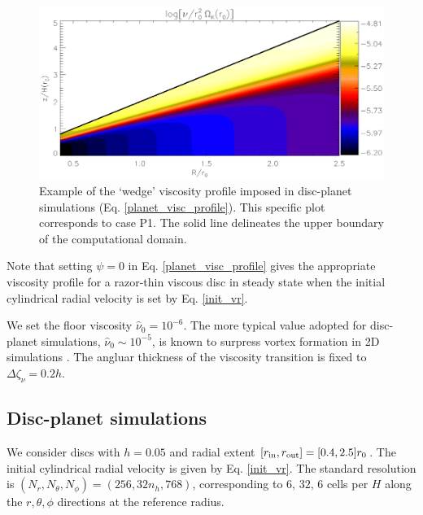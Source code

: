 \begin{figure}
  \centering
  \includegraphics[width=\linewidth]{figures/pdisk_visc2d_planet}
  \caption{Example of the `wedge' viscosity profile
    imposed in disc-planet simulations (Eq. \ref{planet_visc_profile}). This specific plot
    corresponds to case P1. The solid line
    delineates the upper boundary of the computational domain.
    \label{planet_visc2d}}
\end{figure}

Note that setting $\psi = 0$ in Eq. \ref{planet_visc_profile} gives
the appropriate viscosity profile for a razor-thin viscous disc in
steady state when the initial cylindrical radial velocity 
is set by Eq. \ref{init_vr}. 


We set the floor viscosity $\hat{\nu}_0=10^{-6}$. The more typical
value adopted for disc-planet simulations, $\hat{\nu}_0\sim 10^{-5}$,
is known to surpress vortex formation in 2D simulations
\citep{valborro07, mudryk09}. The angluar thickness of the viscosity
transition is fixed to $\Delta\zeta_\nu = 0.2h$.   

\subsection{Disc-planet simulations} 
We consider discs with $h=0.05$ and radial extent
$[r_\mathrm{in},r_\mathrm{out}]=[0.4,2.5]r_0$. The initial cylindrical radial velocity
is given by Eq. \ref{init_vr}. The standard resolution is $(N_r,
N_\theta, N_\phi)=(256, 32n_h, 768)$, corresponding to $6,\,32,\,6$
cells per $H$ along the $r,\theta,\phi$ directions 
at the reference radius. 

